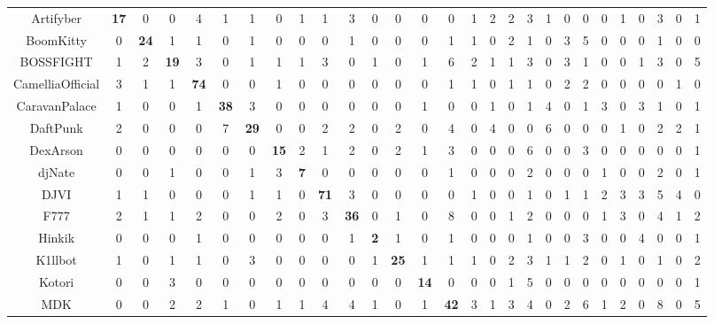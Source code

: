 \documentclass[article,pdftex,12pt,a4paper]{article}
\begin{document}
\begin{table}[htp]
\centering
\setlength{\tabcolsep}{0.05em}
\begin{tabular}{|| c | c c c c c c c c c c c c c c c c c c c c c c c c c c c ||}
\hline
Artifyber & \textbf{17} & 0 & 0 & 4 & 1 & 1 & 0 & 1 & 1 & 3 & 0 & 0 & 0 & 0 & 1 & 2 & 2 & 3 & 1 & 0 & 0 & 0 & 1 & 0 & 3 & 0 & 1 \\ 
BoomKitty & 0 & \textbf{24} & 1 & 1 & 0 & 1 & 0 & 0 & 0 & 1 & 0 & 0 & 0 & 1 & 1 & 0 & 2 & 1 & 0 & 3 & 5 & 0 & 0 & 0 & 1 & 0 & 0 \\ 
BOSSFIGHT & 1 & 2 & \textbf{19} & 3 & 0 & 1 & 1 & 1 & 3 & 0 & 1 & 0 & 1 & 6 & 2 & 1 & 1 & 3 & 0 & 3 & 1 & 0 & 0 & 1 & 3 & 0 & 5 \\ 
CamelliaOfficial & 3 & 1 & 1 & \textbf{74} & 0 & 0 & 1 & 0 & 0 & 0 & 0 & 0 & 0 & 1 & 1 & 0 & 1 & 1 & 0 & 2 & 2 & 0 & 0 & 0 & 0 & 1 & 0 \\ 
CaravanPalace & 1 & 0 & 0 & 1 & \textbf{38} & 3 & 0 & 0 & 0 & 0 & 0 & 0 & 1 & 0 & 0 & 1 & 0 & 1 & 4 & 0 & 1 & 3 & 0 & 3 & 1 & 0 & 1 \\ 
DaftPunk & 2 & 0 & 0 & 0 & 7 & \textbf{29} & 0 & 0 & 2 & 2 & 0 & 2 & 0 & 4 & 0 & 4 & 0 & 0 & 6 & 0 & 0 & 0 & 1 & 0 & 2 & 2 & 1 \\ 
DexArson & 0 & 0 & 0 & 0 & 0 & 0 & \textbf{15} & 2 & 1 & 2 & 0 & 2 & 1 & 3 & 0 & 0 & 0 & 6 & 0 & 0 & 3 & 0 & 0 & 0 & 0 & 0 & 1 \\ 
djNate & 0 & 0 & 1 & 0 & 0 & 1 & 3 & \textbf{7} & 0 & 0 & 0 & 0 & 0 & 1 & 0 & 0 & 0 & 2 & 0 & 0 & 0 & 1 & 0 & 0 & 2 & 0 & 1 \\ 
DJVI & 1 & 1 & 0 & 0 & 0 & 1 & 1 & 0 & \textbf{71} & 3 & 0 & 0 & 0 & 0 & 1 & 0 & 0 & 1 & 0 & 1 & 1 & 2 & 3 & 3 & 5 & 4 & 0 \\ 
F777 & 2 & 1 & 1 & 2 & 0 & 0 & 2 & 0 & 3 & \textbf{36} & 0 & 1 & 0 & 8 & 0 & 0 & 1 & 2 & 0 & 0 & 0 & 1 & 3 & 0 & 4 & 1 & 2 \\ 
Hinkik & 0 & 0 & 0 & 1 & 0 & 0 & 0 & 0 & 0 & 1 & \textbf{2} & 1 & 0 & 1 & 0 & 0 & 0 & 1 & 0 & 0 & 3 & 0 & 0 & 4 & 0 & 0 & 1 \\ 
K1llbot & 1 & 0 & 1 & 1 & 0 & 3 & 0 & 0 & 0 & 0 & 1 & \textbf{25} & 1 & 1 & 1 & 0 & 2 & 3 & 1 & 1 & 2 & 0 & 1 & 0 & 1 & 0 & 2 \\ 
Kotori & 0 & 0 & 3 & 0 & 0 & 0 & 0 & 0 & 0 & 0 & 0 & 0 & \textbf{14} & 0 & 0 & 0 & 1 & 5 & 0 & 0 & 0 & 0 & 0 & 0 & 0 & 0 & 1 \\ 
MDK & 0 & 0 & 2 & 2 & 1 & 0 & 1 & 1 & 4 & 4 & 1 & 0 & 1 & \textbf{42} & 3 & 1 & 3 & 4 & 0 & 2 & 6 & 1 & 2 & 0 & 8 & 0 & 5 \\ 

\end{tabular}
\end{table}
\end{document}
